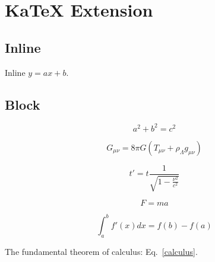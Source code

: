 
\chapter{\label{katex-extension}KaTeX Extension}
\section{\label{inline}Inline}
\par Inline $y=ax+b$.
\section{\label{block}Block}
\par 
\begin{equation}
a^2 + b^2 = c^2
\end{equation}

\par 
\begin{equation*}
G_{\mu\nu} = 8\pi G(T_{\mu\nu} + \rho_{\Lambda} g_{\mu\nu})
\end{equation*}

\par 
\begin{equation}
t' = t \frac{1}{\sqrt{1 - \frac{\nu^2}{c^2}}}
\end{equation}

\par 
\begin{equation}
F = ma
\end{equation}
 
\par 
\begin{equation}
\label{calculus}
 \int_a^b f'(x)dx = f(b) - f(a)
\end{equation}

\par The fundamental theorem of calculus: Eq.~\eqref{calculus}. 